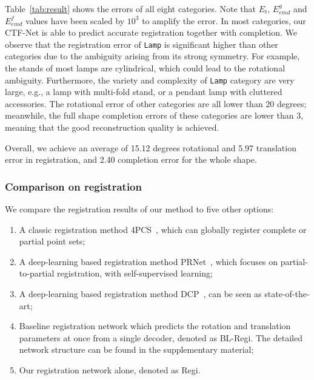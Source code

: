 Table~\ref{tab:result} shows the errors of all eight categories. Note that $E_t$, $E_{emd}^g$ and $E_{emd}^f$ values have been scaled by $10^3$ to amplify the error.
In most categories, our CTF-Net is able to predict accurate registration together with completion.
We observe that the registration error of \texttt{Lamp} is significant higher than other categories due to the ambiguity arising from its strong symmetry. For example, the stands of most lamps are cylindrical, which could lead to the rotational ambiguity. Furthermore, the variety and complexity of \texttt{Lamp} category are very large, e.g., a lamp with multi-fold stand, or a pendant lamp with cluttered accessories.
The rotational error of other categories are all lower than 20 degrees; meanwhile, the full shape completion errors of these categories are lower than $3$, meaning that the good reconstruction quality is achieved.

Overall, we achieve an average of 15.12 degrees rotational and 5.97 translation error in registration, and 2.40 completion error for the whole shape.


\subsubsection{Comparison on registration}

We compare the registration results of our method to five other options:
\begin{enumerate}
	\item A classic registration method 4PCS~\cite{aiger20084pcs}, which can globally register complete or partial point sets;
	\item A deep-learning based registration method PRNet~\cite{wang2019prnet}, which focuses on partial-to-partial registration, with self-supervised learning;
	\item A deep-learning based registration method DCP~\cite{wang2019dcp}, can be seen as state-of-the-art;
	\item Baseline registration network which predicts the rotation and translation parameters at once from a single decoder, denoted as BL-Regi. The detailed network structure can be found in the supplementary material;
	\item Our registration network alone, denoted as Regi.
\end{enumerate}






